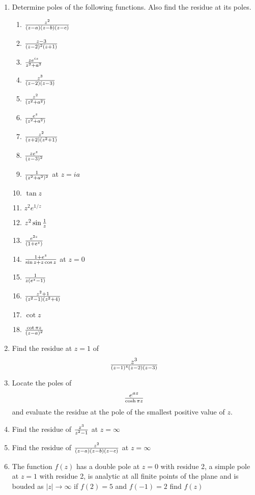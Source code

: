 \begin{enumerate}
     	\item Determine poles of the following functions. Also find the residue at its poles.
           	\begin{enumerate}
           	\item $z^2 \over (z-a)(z-b)(z-c)$
           	\item $z-3 \over (z-2)^2 (z+1)$
           	\item $ze^{iz} \over z^2 + a^2$
           	\item $z^3 \over (z-2)(z-3)$
           	\item $z^2 \over (z^2 + a^2)$
           	\item $e^z \over (z^2 + a^2)$
           	\item $z^2 \over (z+2)(z^2+1)$
           	\item $ze^z \over (z-3)^2$
           	\item $1 \over (z^2+a^2)^2$ at $z=ia$
           	\item $\tan z$
           	\item $z^2 e^{1/z}$
           	\item $z^2 \sin {1 \over z}$
           	\item $e^{2z} \over (1+e^z)$
           	\item $1+e^z \over \sin z + z \cos z$ at $z=0$
           	\item $1 \over z(e^z-1)$
           	\item $z^2 +1 \over (z^2-1)(z^2+4)$
           	\item $\cot z$
           	\item $\cot \pi z \over (z-a)^2$
                     \end{enumerate}
		\item Find the residue at $z=1$ of \[z^3 \over (z-1)^4(z-2)(z-3)\]
		\item Locate the poles of \[e^{az} \over \cosh \pi z\] and evaluate the residue at the pole of the smallest positive value of $z$.
		\item Find the residue of $z^3 \over z^2-1$ at $z=\infty$
		\item Find the residue of $z^2 \over (z-a)(z-b)(z-c)$ at ${z=\infty}$
	\item The function $f(z)$ has a double pole at $z=0$ with residue 2, a simple pole at $z=1$ with residue 2, is analytic at all finite points of the plane and is bouded as $|z|\rightarrow \infty$ if $f(2)=5$ and $f(-1)=2$ find $f(z)$						
\end{enumerate}


